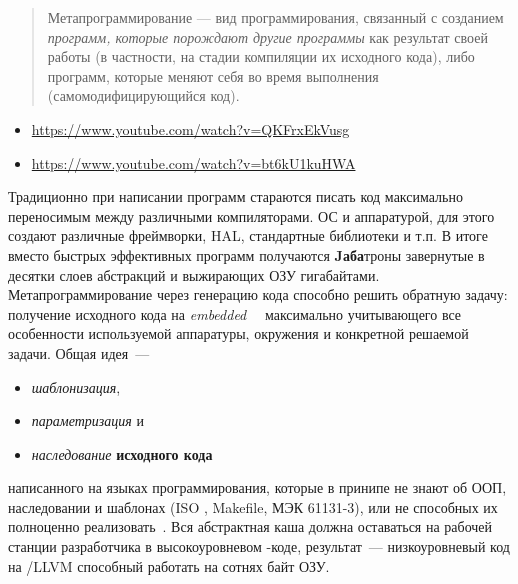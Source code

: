 \clearpage
{}\label{meta}

\begin{quotation}\noindent
Метапрограммирование — вид программирования, связанный с созданием
\textit{программ, которые порождают другие программы} как результат своей работы
(в частности, на стадии компиляции их исходного кода), либо программ, которые
меняют себя во время выполнения (самомодифицирующийся код).
\end{quotation}

\begin{itemize}
  \item 
\url{https://www.youtube.com/watch?v=QKFrxEkVusg}
  \item 
\url{https://www.youtube.com/watch?v=bt6kU1kuHWA}
\end{itemize}

\noindent
Традиционно при написании программ стараются писать код максимально переносимым
между различными компиляторами. ОС и аппаратурой, для этого создают различные
фреймворки, HAL, стандартные библиотеки и т.п. В итоге вместо быстрых
эффективных программ получаются \textbf{Jаба}троны завернутые в десятки слоев
абстракций и выжирающих ОЗУ гигабайтами.
Метапрограммирование через генерацию кода способно решить обратную задачу:
получение исходного кода на \textit{embedded \emc}\ \ максимально
учитывающего все особенности используемой аппаратуры, окружения и конкретной
решаемой задачи. Общая идея\ ---
\begin{itemize}[nosep]
  \item 
\emph{шаблонизация}, 
  \item 
\emph{параметризация} и 
  \item 
\emph{наследование} \textbf{исходного кода}
\end{itemize}
написанного на языках программирования, которые в принипе не знают об ООП,
наследовании и шаблонах (ISO \emc, Makefile, МЭК 61131-3), или не способных их
полноценно реализовать\ . Вся абстрактная каша должна
оставаться на рабочей станции разработчика в высокоуровневом \py-коде,
результат\ --- низкоуровневый код на \emc/LLVM способный работать на сотнях байт
ОЗУ.

